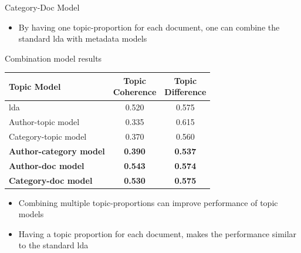 \begin{frame}{\insertsubsection}{Category-Doc Model}
	\begin{figure}
		\centering
		\resizebox{0.35\columnwidth}{!}{%
			
		}
	\end{figure}
	\begin{itemize}
		\item<1-> By having one topic-proportion for each document, one can combine the standard \gls{lda} with metadata models
	\end{itemize}
\end{frame}

\begin{frame}{\insertsubsection}{Combination model results}
	\begin{table}
		\centering
		\begin{tabular}{l|c|c}
			Topic Model & \makecell{Topic \\ Coherence} & \makecell{Topic \\ Difference} \\
			\midrule
			\Acrlong{lda} & 0.520 & 0.575 \\
			Author-topic model & 0.335 & 0.615 \\
			Category-topic model & 0.370 & 0.560 \\
			\textbf{Author-category model} & \textbf{0.390} & \textbf{0.537} \\
			\textbf{Author-doc model} & \textbf{0.543} & \textbf{0.574} \\
			\textbf{Category-doc model} &\textbf{ 0.530} & \textbf{0.575} \\
		\end{tabular}
	\end{table}
	\begin{itemize}
		\item<2-> Combining multiple topic-proportions can improve performance of topic models
		\item<3-> Having a topic proportion for each document, makes the performance similar to the standard \gls{lda}
	\end{itemize}
\end{frame}

